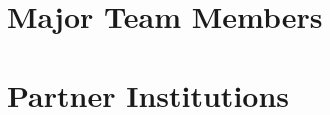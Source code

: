 \documentclass[11pt]{article}
\begin{document}
\pagestyle{empty}

\section*{Major Team Members}

\section*{Partner Institutions}
\end{document}
